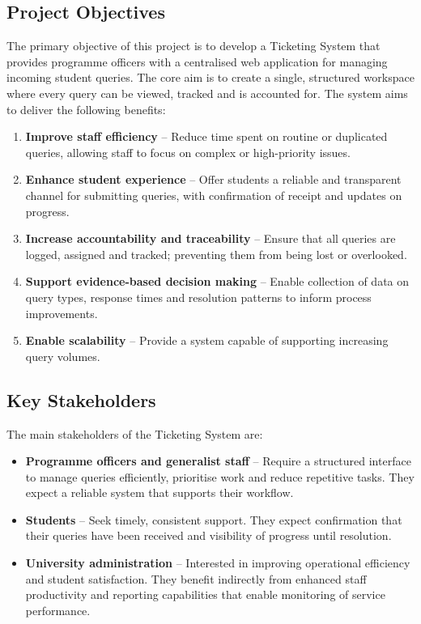 \subsection{Project Objectives}

The primary objective of this project is to develop a Ticketing System that provides programme officers with a centralised web application for managing incoming student queries. The core aim is to create a single, structured workspace where every query can be viewed, tracked and is accounted for. 
The system aims to deliver the following benefits:

\begin{enumerate}
\item \textbf{Improve staff efficiency} – Reduce time spent on routine or duplicated queries, allowing staff to focus on complex or high-priority issues.

\item \textbf{Enhance student experience} – Offer students a reliable and transparent channel for submitting queries, with confirmation of receipt and updates on progress.

\item \textbf{Increase accountability and traceability} – Ensure that all queries are logged, assigned and tracked; preventing them from being lost or overlooked.

\item \textbf{Support evidence-based decision making} – Enable collection of data on query types, response times and resolution patterns to inform process improvements.

\item \textbf{Enable scalability} – Provide a system capable of supporting increasing query volumes.
\end{enumerate}

\subsection{Key Stakeholders}

The main stakeholders of the Ticketing System are:

\begin{itemize}
\item \textbf{Programme officers and generalist staff} – Require a structured interface to manage queries efficiently, prioritise work and reduce repetitive tasks. They expect a reliable system that supports their workflow.

\item \textbf{Students} – Seek timely, consistent support. They expect confirmation that their queries have been received and visibility of progress until resolution.

\item \textbf{University administration} – Interested in improving operational efficiency and student satisfaction. They benefit indirectly from enhanced staff productivity and reporting capabilities that enable monitoring of service performance.
\end{itemize}

